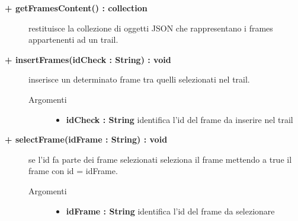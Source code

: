 \begin{description}
\begin{description}
\begin{description}
\begin{itemize}
				\end{itemize}
		\end{description}
	\end{description}
	
	\begin{description}
		\item[\textbf{\color{blue}+ getFramesContent() : collection			}] \hfill
			restituisce la collezione di oggetti JSON che rappresentano i frames appartenenti ad un trail.
			
	\end{description}
	
	\begin{description}
		\item[\textbf{\color{blue}+ insertFrames(idCheck : String) : void			}] \hfill
			inserisce un determinato frame tra quelli selezionati nel trail.
			
		\begin{description}
			\item[Argomenti] \hfill
				\begin{itemize}
				
					\item \textbf{idCheck : String			} \hfill
						identifica l'id del frame da inserire nel trail
					
				\end{itemize}
		\end{description}
	\end{description}
	
	\begin{description}
		\item[\textbf{\color{blue}+ selectFrame(idFrame : String) : void			}] \hfill
			se l'id fa parte dei frame selezionati seleziona il frame mettendo a true il frame con id = idFrame.
			
		\begin{description}
			\item[Argomenti] \hfill
				\begin{itemize}
				
					\item \textbf{idFrame : String			} \hfill
						identifica l'id del frame da selezionare
					
				\end{itemize}
		\end{description}
	\end{description}
	

\end{description}
